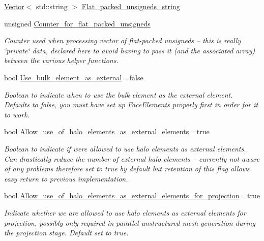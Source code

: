 \begin{DoxyCompactItemize}
\hyperlink{classoomph_1_1Vector}{Vector}$<$ std\+::string $>$ \hyperlink{namespaceoomph_1_1Multi__domain__functions_a910c65c750d007e76f9175993179d151}{Flat\+\_\+packed\+\_\+unsigneds\+\_\+string}
\item 
unsigned \hyperlink{namespaceoomph_1_1Multi__domain__functions_a20f6de2e1bd15cb40c461d2ca3940bd7}{Counter\+\_\+for\+\_\+flat\+\_\+packed\+\_\+unsigneds}
\begin{DoxyCompactList}\small\item\em Counter used when processing vector of flat-\/packed unsigneds -- this is really \char`\"{}private\char`\"{} data, declared here to avoid having to pass it (and the associated array) between the various helper functions. \end{DoxyCompactList}\item 
bool \hyperlink{namespaceoomph_1_1Multi__domain__functions_abc1119753cf68493ba6ea43c2a8bc378}{Use\+\_\+bulk\+\_\+element\+\_\+as\+\_\+external} =false
\begin{DoxyCompactList}\small\item\em Boolean to indicate when to use the bulk element as the external element. Defaults to false, you must have set up Face\+Elements properly first in order for it to work. \end{DoxyCompactList}\item 
bool \hyperlink{namespaceoomph_1_1Multi__domain__functions_aa3b57b233a416885018e8993db0b291c}{Allow\+\_\+use\+\_\+of\+\_\+halo\+\_\+elements\+\_\+as\+\_\+external\+\_\+elements} =true
\begin{DoxyCompactList}\small\item\em Boolean to indicate if we\textquotesingle{}re allowed to use halo elements as external elements. Can drastically reduce the number of external halo elements -- currently not aware of any problems therefore set to true by default but retention of this flag allows easy return to previous implementation. \end{DoxyCompactList}\item 
bool \hyperlink{namespaceoomph_1_1Multi__domain__functions_aa45f040b8ffc6448777fae76190d308c}{Allow\+\_\+use\+\_\+of\+\_\+halo\+\_\+elements\+\_\+as\+\_\+external\+\_\+elements\+\_\+for\+\_\+projection} =true
\begin{DoxyCompactList}\small\item\em Indicate whether we are allowed to use halo elements as external elements for projection, possibly only required in parallel unstructured mesh generation during the projection stage. Default set to true. \end{DoxyCompactList}\item 

\end{DoxyCompactItemize}
